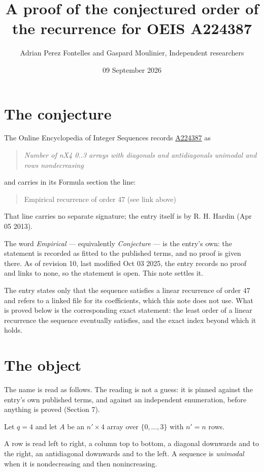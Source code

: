 \documentclass[11pt]{article}
\title{A proof of the conjectured order of the recurrence for OEIS A224387}
\author{Adrian Perez Fontelles and Gaspard Moulinier, Independent researchers}
\date{09 September 2026}
\theoremstyle{definition}
\begin{document}
\maketitle
\section{The conjecture}

The Online Encyclopedia of Integer Sequences records \href{https://oeis.org/A224387}{A224387} as

\begin{quote}\itshape Number of nX4 0..3 arrays with diagonals and antidiagonals unimodal and rows nondecreasing\end{quote}

and carries in its Formula section the line:

\begin{quote}\ttfamily Empirical recurrence of order 47 (see link above)\end{quote}

That line carries no separate signature; the entry itself is by R. H. Hardin (Apr 05 2013).

The word {\itshape Empirical} --- equivalently {\itshape Conjecture} --- is the entry's own: the statement is recorded as fitted to the published terms, and no proof is given there. As of revision 10, last modified Oct 03 2025, the entry records no proof and links to none, so the statement is open. This note settles it.

The entry states only that the sequence satisfies a linear recurrence of order $47$ and refers to a linked file for its coefficients, which this note does not use. What is proved below is the corresponding exact statement: the least order of a linear recurrence the sequence eventually satisfies, and the exact index beyond which it holds.

\section{The object}

The name is read as follows. The reading is not a guess: it is pinned against the entry's own published terms, and against an independent enumeration, before anything is proved (Section 7).

Let $q = 4$ and let $A$ be an $n' \times 4$ array over $\{0,\dots,3\}$ with $n' = n$ rows.

A row is read left to right, a column top to bottom, a diagonal downwards and to the right, an antidiagonal downwards and to the left. A sequence is {\itshape unimodal} when it is nondecreasing and then nonincreasing.
\end{document}
